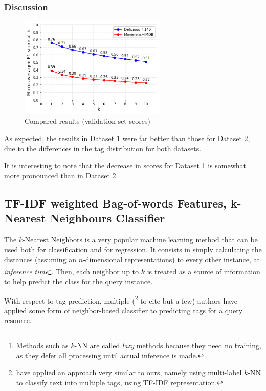 \subsubsection{Discussion}

\begin{figure}[H]
    \centering
    \includegraphics[width=7cm]{chapters/05_experiments/images/proposal-1-compared-ovr-svm-bow.png}
    \caption{Compared results (validation set scores)}
    \label{fig:compared_ovr_svm}
\end{figure}

As expected, the results in Dataset 1 were far better than those for Dataset 2, due to the differences in the tag distribution for both datasets.

It is interesting to note that the decrease in scores for Dataset 1 is somewhat more pronounced than in Dataset 2.

\subsection{TF-IDF weighted Bag-of-words Features, k-Nearest Neighbours Classifier}

The $k$-Nearest Neighbors is a very popular machine learning method that can be used both for classification and for regression. It consists in simply calculating the distances (assuming an $n$-dimensional representations) to every other instance, at \textit{inference time}\footnote{Methods such as $k$-NN are called \textit{lazy} methods because they need no training, as they defer all processing until actual inference is made.}. Then, each neighbor up to $k$ is treated as a source of information to help predict the class for the query instance. 

With respect to tag prediction, multiple (\cite{martinez_etal_2009,chidlovskii_2012,zhang_etal_2015,charte_etal_2015}\footnote{\cite{charte_etal_2015} have applied an approach very similar to ours, namely using multi-label $k$-NN to classify text into multiple tags, using TF-IDF representation. } to cite but a few) authors have applied some form of neighbor-based classifier to predicting tags for a query resource. 

